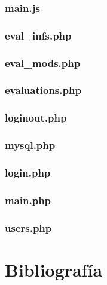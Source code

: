 \documentclass[12pt,a4paper,spanish,twoside]{article}
\begin{document}
\subsubsection{main.js}

\subsubsection{eval\_infs.php}
%
\subsubsection{eval\_mods.php}
%
\subsubsection{evaluations.php}
%
\subsubsection{loginout.php}

\subsubsection{mysql.php}

\subsubsection{login.php}

\subsubsection{main.php}

\subsubsection{users.php}


\section{Bibliografía}
\end{document}
